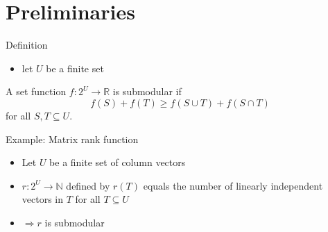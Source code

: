 \documentclass[usenames,dvipsnames]{beamer}
\newcommand{\R}{\mathbb{R}}
\newcommand{\N}{\mathbb{N}}
\newcommand{\Z}{\mathbb{Z}}
\begin{document}
\section{Preliminaries}


\begin{frame}{Definition}
  \begin{itemize}
  \item  let $U$ be a finite set 
  \end{itemize}
  \begin{definition}
    A set function $f : 2^U \rightarrow \R$ is submodular if \[f(S) +
    f(T) \geq f(S \cup T) + f(S \cap T)\] for all $S,T \subseteq U$.
  \end{definition}
  
\end{frame}

\begin{frame}{Example: Matrix rank function}
  \begin{itemize}
    \item Let $U$ be a finite set of column vectors 
    \item $r : 2^U \rightarrow \N$ defined by $r(T)$ equals the number
      of linearly independent vectors in $T$ for all $T \subseteq U$
    \item $\Rightarrow r$ is submodular
  \end{itemize}
\end{frame}
\end{document}
